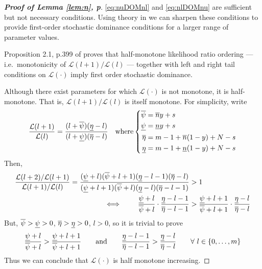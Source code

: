\documentclass[12pt, a4paper]{elsarticle}
\begin{document}
\begin{proof}[\textbf{Proof of Lemma \ref{lem:n}, p\pageref{lem:n}}]
  \label{prf:n2}
  \eqref{eq:nuDOMnl} and \eqref{eq:nlDOMnu}
  are sufficient but not necessary conditions.  Using theory in 
  \cite{klenke2010} we can sharpen these conditions to provide
  first-order stochastic dominance conditions for a larger range of
  parameter values.
  
  Proposition 2.1, p.399 of \cite{klenke2010} proves that half-monotone
  likelihood ratio ordering --- i.e.\ monotonicity of $\mathcal{L}(l+1) / \mathcal{L}(l)$ ---
  together with left and right tail conditions on $\mathcal{L}(\cdot)$
  imply first order stochastic dominance.
  
  \medskip
  
  Although there exist parameters for which $\mathcal{L}(\cdot)$ is
  not monotone, it is half-monotone.  That is, $\mathcal{L}(l+1) / \mathcal{L}(l)$ is itself monotone.  For simplicity, write
  \begin{align*}
    \frac{\mathcal{L}(l+1)}{\mathcal{L}(l)} = \frac{(l + \overline{\psi})(\underline{\eta} - l)}{(l + \underline{\psi})(\overline{\eta} - l)}
    \quad \mbox{where} \left\{\begin{aligned}
      \overline{\psi} &= \overline{n} y + s \\
      \underline{\psi} &= \underline{n} y + s \\
      \overline{\eta} &= m - 1 + \overline{n} (1 - y) + N - s \\
      \underline{\eta} &= m - 1 + \underline{n} (1 - y) + N - s
    \end{aligned} \right.
  \end{align*}
  Then,
  \begin{align*}
    \frac{\mathcal{L}(l+2)/\mathcal{L}(l+1)}{\mathcal{L}(l+1)/\mathcal{L}(l)} =
    \frac{(\underline{\psi} + l)(\overline{\psi} + l + 1)(\underline{\eta} - l - 1)(\overline{\eta} - l)}
           {(\underline{\psi} + l + 1)(\overline{\psi} + l)(\underline{\eta} -
l)(\overline{\eta} - l - 1)}
    &> 1 \\
    \iff \qquad \frac{\underline{\psi} + l}{\overline{\psi} + l} \cdot \frac{\underline{\eta} - l - 1}{\overline{\eta} - l - 1} 
    &> \frac{\underline{\psi} + l + 1}{\overline{\psi} + l + 1} \cdot \frac{\underline{\eta} -
l}{\overline{\eta} - l}
  \end{align*}
  But, $\overline{\psi} > \underline{\psi} > 0$, $\overline{\eta} > \underline{\eta} > 0$, $l > 0$, %
  so it is trivial to prove
  \[
    \frac{\underline{\psi} + l}{\overline{\psi} + l} > \frac{\underline{\psi} + l + 1}{\overline{\psi} + l + 1} \qquad\mbox{and}\qquad \frac{\underline{\eta} - l - 1}{\overline{\eta} - l - 1} > \frac{\underline{\eta} -
l}{\overline{\eta} - l} \qquad \forall\ l \in \{0,\dots,m\}
  \]
  Thus we can conclude that $\mathcal{L}(\cdot)$ is half monotone increasing.


\end{proof}
\end{document}
